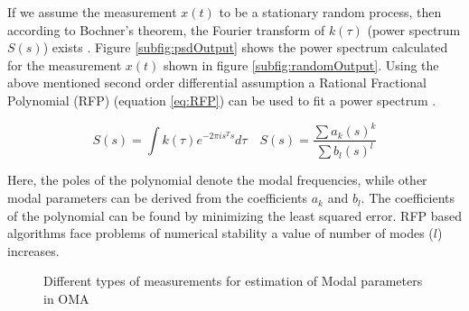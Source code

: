 If we assume the measurement $x(t)$ to be a stationary random process, then according to Bochner's theorem, the Fourier transform of $k(\tau)$ (power spectrum $S(s)$) exists \cite{bochner2016lectures}. Figure \ref{subfig:psdOutput} shows the power spectrum calculated for the measurement $x(t)$ shown in figure \ref{subfig:randomOutput}. Using the above mentioned second order differential assumption a Rational Fractional Polynomial (RFP) (equation \ref{eq:RFP}) can be used to fit a power spectrum \cite{richardson1982parameter, allemang1998unified, chauhan2007unified}.

\begin{equation}\label{eq:RFP}
S(s) = \int k(\tau) e^{-2 \pi is^{T} s}d\tau \quad    S(s) = \frac{\sum a_{k}(s)^{k}}{\sum b_{l}(s)^{l}}
\end{equation}

Here, the poles of the polynomial denote the modal frequencies, while other modal parameters can be derived from the coefficients $a_{k}$ and $b_{l}$. The coefficients of the polynomial can be found by minimizing the least squared error. RFP based algorithms face problems of numerical stability a value of number of modes ($l$) increases.

\begin{figure}[!ht]
  \centering
  \quad
  \quad
  
  \caption{Different types of measurements for estimation of Modal parameters in OMA}
\end{figure}

